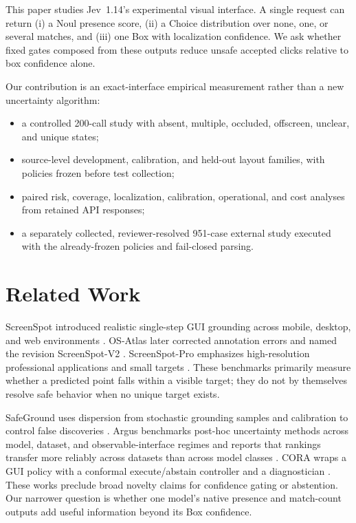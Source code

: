 \documentclass[10pt,twocolumn]{article}
\newcommand{\jev}{Jev~1.14}
\begin{document}
This paper studies \jev's experimental visual interface. A single request can return (i) a Noul presence score, (ii) a Choice distribution over none, one, or several matches, and (iii) one Box with localization confidence. We ask whether fixed gates composed from these outputs reduce unsafe accepted clicks relative to box confidence alone.

Our contribution is an exact-interface empirical measurement rather than a new uncertainty algorithm:
\begin{itemize}
  \item a controlled 200-call study with absent, multiple, occluded, offscreen, unclear, and unique states;
  \item source-level development, calibration, and held-out layout families, with policies frozen before test collection;
  \item paired risk, coverage, localization, calibration, operational, and cost analyses from retained API responses;
  \item a separately collected, reviewer-resolved 951-case external study executed with the already-frozen policies and fail-closed parsing.
\end{itemize}

\section{Related Work}
ScreenSpot introduced realistic single-step GUI grounding across mobile, desktop, and web environments \cite{seeclick}. OS-Atlas later corrected annotation errors and named the revision ScreenSpot-V2 \cite{osatlas}. ScreenSpot-Pro emphasizes high-resolution professional applications and small targets \cite{screenspotpro}. These benchmarks primarily measure whether a predicted point falls within a visible target; they do not by themselves resolve safe behavior when no unique target exists.

SafeGround uses dispersion from stochastic grounding samples and calibration to control false discoveries \cite{safeground}. Argus benchmarks post-hoc uncertainty methods across model, dataset, and observable-interface regimes and reports that rankings transfer more reliably across datasets than across model classes \cite{argus}. CORA wraps a GUI policy with a conformal execute/abstain controller and a diagnostician \cite{cora}. These works preclude broad novelty claims for confidence gating or abstention. Our narrower question is whether one model's native presence and match-count outputs add useful information beyond its Box confidence.
\end{document}
